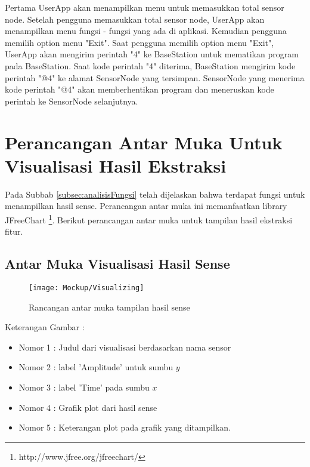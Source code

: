 Pertama UserApp akan menampilkan menu untuk memasukkan total sensor node. Setelah pengguna memasukkan total sensor node, UserApp akan menampilkan menu fungsi - fungsi yang ada di aplikasi. Kemudian pengguna memilih option menu "Exit". Saat pengguna memilih option menu "Exit", UserApp akan mengirim perintah "4" ke BaseStation untuk mematikan program pada BaseStation. Saat kode perintah "4" diterima, BaseStation mengirim kode perintah "@4" ke alamat SensorNode yang tersimpan. SensorNode yang menerima kode perintah "@4" akan memberhentikan program dan meneruskan kode perintah ke SensorNode selanjutnya.

\section{Perancangan Antar Muka Untuk Visualisasi Hasil Ekstraksi}
Pada Subbab \ref{subsec:analisisFungsi} telah dijelaskan bahwa terdapat fungsi untuk menampilkan hasil sense. Perancangan antar muka ini memanfaatkan library JFreeChart \footnote{http://www.jfree.org/jfreechart/}. Berikut perancangan antar muka untuk tampilan hasil ekstraksi fitur.
\subsection{Antar Muka Visualisasi Hasil Sense }
\begin{figure}[H]
	\centering
	\texttt{[image: Mockup/Visualizing]}  
	\caption[Rancangan antar muka tampilan hasil sense]{Rancangan antar muka tampilan hasil sense} 
	\label{fig:MockupVisualizing} 
\end{figure} 
Keterangan Gambar : 
\begin{itemize}
	\item Nomor 1 : Judul dari visualisasi berdasarkan nama sensor
	\item Nomor 2 : label 'Amplitude' untuk sumbu $y$
	\item Nomor 3 : label 'Time' pada sumbu $x$
	\item Nomor 4 : Grafik plot dari hasil sense
	\item Nomor 5 : Keterangan plot pada grafik yang ditampilkan.
\end{itemize}

